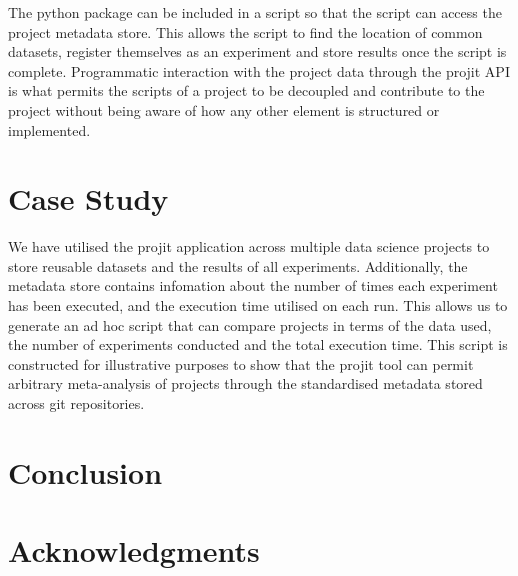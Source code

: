 \documentclass[sigconf]{acmart}
\begin{document}
The python package can be included in a script so that the script can access the project metadata store.
This allows the script to find the location of common datasets, register themselves as an experiment
and store results once the script is complete. Programmatic interaction with the project data through
the projit API is what permits the scripts of a project to be decoupled and contribute to the project
without being aware of how any other element is structured or implemented.

\section{Case Study}

We have utilised the projit application across multiple data science projects to store reusable datasets
and the results of all experiments. Additionally, the metadata store contains infomation about the number
of times each experiment has been executed, and the execution time utilised on each run. This allows us
to generate an ad hoc script that can compare projects in terms of the data used, the number of experiments
conducted and the total execution time. This script is constructed for illustrative purposes to show that
the projit tool can permit arbitrary meta-analysis of projects through the standardised metadata stored across
git repositories.


\section{Conclusion}


\section{Acknowledgments}



\end{document}
